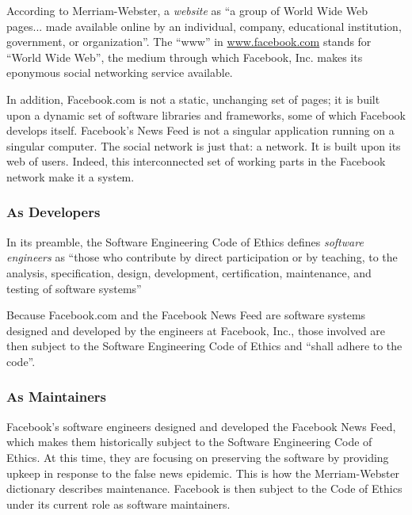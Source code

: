 \par According to Merriam-Webster, a \emph{website} as ``a group of World Wide Web pages... made available online by an individual, company, educational institution, government, or organization''. \cite{merriam_webster} The ``www'' in \url{www.facebook.com} stands for ``World Wide Web'', the medium through which Facebook, Inc. makes its eponymous social networking service available.

\par In addition, Facebook.com is not a static, unchanging set of pages; it is built upon a dynamic set of software libraries and frameworks, some of which Facebook develops itself. \cite{fb_code} Facebook's News Feed is not a singular application running on a singular computer. The social network is just that: a network. It is built upon its web of users.  Indeed, this interconnected set of working parts in the Facebook network make it a system. \cite{oxford}

\subsubsection{As Developers}

\par In its preamble, the Software Engineering Code of Ethics defines \emph{software engineers} as ``those who contribute by direct participation or by teaching, to the analysis, specification, design, development, certification, maintenance, and testing of software systems'' 

\par Because Facebook.com and the Facebook News Feed are software systems designed and developed by the engineers at Facebook, Inc., those involved are then subject to the Software Engineering Code of Ethics and ``shall adhere to the code''. \cite{se_code}

\subsubsection{As Maintainers}

\par Facebook's software engineers designed and developed the Facebook News Feed, which makes them historically subject to the Software Engineering Code of Ethics. At this time, they are focusing on preserving the software by providing upkeep in response to the false news epidemic. This is how the Merriam-Webster dictionary describes maintenance. \cite{merriam_webster} Facebook is then subject to the Code of Ethics under its current role as software maintainers.

